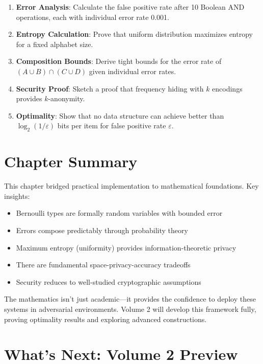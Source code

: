 \begin{enumerate}
\item \textbf{Error Analysis}: Calculate the false positive rate after 10 Boolean AND operations, each with individual error rate 0.001.

\item \textbf{Entropy Calculation}: Prove that uniform distribution maximizes entropy for a fixed alphabet size.

\item \textbf{Composition Bounds}: Derive tight bounds for the error rate of $(A \cup B) \cap (C \cup D)$ given individual error rates.

\item \textbf{Security Proof}: Sketch a proof that frequency hiding with $k$ encodings provides $k$-anonymity.

\item \textbf{Optimality}: Show that no data structure can achieve better than $\log_2(1/\varepsilon)$ bits per item for false positive rate $\varepsilon$.
\end{enumerate}

\section{Chapter Summary}

This chapter bridged practical implementation to mathematical foundations. Key insights:

\begin{itemize}
\item Bernoulli types are formally random variables with bounded error
\item Errors compose predictably through probability theory
\item Maximum entropy (uniformity) provides information-theoretic privacy
\item There are fundamental space-privacy-accuracy tradeoffs
\item Security reduces to well-studied cryptographic assumptions
\end{itemize}

The mathematics isn't just academic—it provides the confidence to deploy these systems in adversarial environments. Volume 2 will develop this framework fully, proving optimality results and exploring advanced constructions.

\section{What's Next: Volume 2 Preview}

